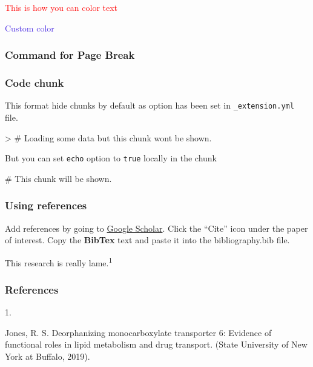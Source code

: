 \documentclass[
  twocolumn]{article}
\newenvironment{Shaded}{\begin{snugshade}}{\end{snugshade}}
\newcommand{\CommentTok}[1]{\textcolor[rgb]{0.37,0.37,0.37}{#1}}
\newcommand{\SpecialCharTok}[1]{\textcolor[rgb]{0.37,0.37,0.37}{#1}}
\newlength{\cslhangindent}
\newlength{\csllabelwidth}
\newlength{\cslentryspacingunit} %
\newenvironment{CSLReferences}[2] %
 {%
  \setlength{\parindent}{0pt}
  \ifodd #1
  \let\oldpar\par
  \def\par{\hangindent=\cslhangindent\oldpar}
  \fi
  \setlength{\parskip}{#2\cslentryspacingunit}
 }%
 {}
\newcommand{\CSLLeftMargin}[1]{\parbox[t]{\csllabelwidth}{#1}}
\newcommand{\CSLRightInline}[1]{\parbox[t]{\linewidth - \csllabelwidth}{#1}\break}
\begin{document}
\textcolor{red}{This is how you can color text}

\textcolor[HTML]{4f31e4}{Custom color}

\hypertarget{command-for-page-break-pagebreak}{%
\subsubsection{\texorpdfstring{Command for Page Break
\texttt{}}{Command for Page Break }}\label{command-for-page-break-pagebreak}}

\newpage{}

\hypertarget{sec-chunks}{%
\subsubsection{Code chunk}\label{sec-chunks}}

This format hide chunks by default as option has been set in
\texttt{\_extension.yml} file.

\begin{Shaded}
\begin{Highlighting}[]
\SpecialCharTok{\textgreater{}} \CommentTok{\# Loading some data but this chunk won\textquotesingle{}t be shown.}
\end{Highlighting}
\end{Shaded}

But you can set \texttt{echo} option to \texttt{true} locally in the
chunk

\begin{Shaded}
\begin{Highlighting}[]
\CommentTok{\# This chunk will be shown. }
\end{Highlighting}
\end{Shaded}

\hypertarget{using-references}{%
\subsubsection{Using references}\label{using-references}}

Add references by going to \href{https://scholar.google.com/}{Google
Scholar}. Click the ``Cite'' icon under the paper of interest. Copy the
\textbf{BibTex} text and paste it into the bibliography.bib file.

This research is really lame.\textsuperscript{1}

\hypertarget{references}{%
\subsubsection{References}\label{references}}

\hypertarget{refs}{}
\begin{CSLReferences}{0}{0}
\leavevmode{}%
\CSLLeftMargin{1. }%
\CSLRightInline{Jones, R. S. Deorphanizing monocarboxylate transporter
6: Evidence of functional roles in lipid metabolism and drug transport.
(State University of New York at Buffalo, 2019).}

\end{CSLReferences}
\end{document}
